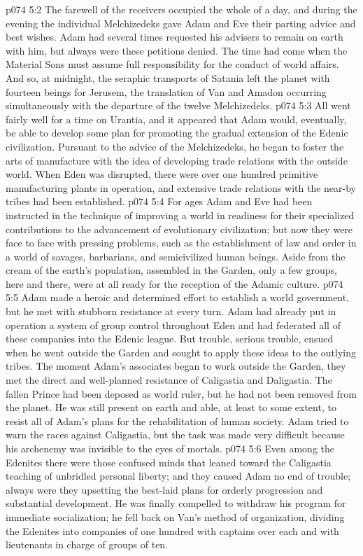\vs p074 5:2 The farewell of the receivers occupied the whole of a day, and during the evening the individual Melchizedeks gave Adam and Eve their parting advice and best wishes. Adam had several times requested his advisers to remain on earth with him, but always were these petitions denied. The time had come when the Material Sons must assume full responsibility for the conduct of world affairs. And so, at midnight, the seraphic transports of Satania left the planet with fourteen beings for Jerusem, the translation of Van and Amadon occurring simultaneously with the departure of the twelve Melchizedeks.
\pc \vs p074 5:3 All went fairly well for a time on Urantia, and it appeared that Adam would, eventually, be able to develop some plan for promoting the gradual extension of the Edenic civilization. Pursuant to the advice of the Melchizedeks, he began to foster the arts of manufacture with the idea of developing trade relations with the outside world. When Eden was disrupted, there were over one hundred primitive manufacturing plants in operation, and extensive trade relations with the near\hyp{}by tribes had been established.
\vs p074 5:4 For ages Adam and Eve had been instructed in the technique of improving a world in readiness for their specialized contributions to the advancement of evolutionary civilization; but now they were face to face with pressing problems, such as the establishment of law and order in a world of savages, barbarians, and semicivilized human beings. Aside from the cream of the earth’s population, assembled in the Garden, only a few groups, here and there, were at all ready for the reception of the Adamic culture.
\vs p074 5:5 Adam made a heroic and determined effort to establish a world government, but he met with stubborn resistance at every turn. Adam had already put in operation a system of group control throughout Eden and had federated all of these companies into the Edenic league. But trouble, serious trouble, ensued when he went outside the Garden and sought to apply these ideas to the outlying tribes. The moment Adam’s associates began to work outside the Garden, they met the direct and well\hyp{}planned resistance of Caligastia and Daligastia. The fallen Prince had been deposed as world ruler, but he had not been removed from the planet. He was still present on earth and able, at least to some extent, to resist all of Adam’s plans for the rehabilitation of human society. Adam tried to warn the races against Caligastia, but the task was made very difficult because his archenemy was invisible to the eyes of mortals.
\vs p074 5:6 Even among the Edenites there were those confused minds that leaned toward the Caligastia teaching of unbridled personal liberty; and they caused Adam no end of trouble; always were they upsetting the best\hyp{}laid plans for orderly progression and substantial development. He was finally compelled to withdraw his program for immediate socialization; he fell back on Van’s method of organization, dividing the Edenites into companies of one hundred with captains over each and with lieutenants in charge of groups of ten.
